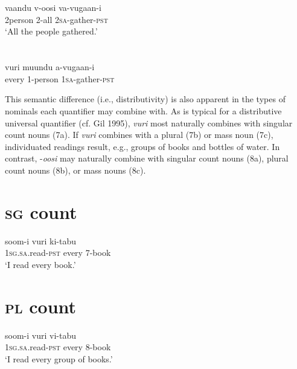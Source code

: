 \documentclass[output=paper]{langsci/langscibook}
\begin{document}
\chapter{}
\chapter{}
\gll vaandu  v-oosi    va-vugaan-i\\
     2person  2-all    2\textsc{sa}{}-gather-\textsc{pst  }\\
\glt ‘All the people gathered.’
\z

\chapter{}
\gll *vuri  muundu  a-vugaan-i  \\
\glt every  1-person  1\textsc{sa}{}-gather-\textsc{pst  }
\z

  This semantic difference (i.e., distributivity) is also apparent in the types of nominals each quantifier may combine with. As is typical for a distributive universal quantifier (cf. Gil 1995), \textit{vuri} most naturally combines with singular count nouns (7a). If \textit{vuri} combines with a plural (7b) or mass noun (7c), individuated readings result, e.g., groups of books and bottles of water. In contrast, -\textit{oosi} may naturally combine with singular count nouns (8a), plural count nouns (8b), or mass nouns (8c).

\chapter[  ]{\textit{  }}
\chapter[sg count]{\textsc{sg} count}
\gll soom-i      vuri    ki-tabu    \\
     1\textsc{sg.sa}.read-\textsc{pst}  every    7-book  \\
\glt ‘I read every book.’
\z

\chapter[pl count]{\textsc{pl} count}
\gll soom-i      vuri    vi-tabu    \\
     1\textsc{sg.sa}.read-\textsc{pst}  every    8-book\\
\glt ‘I read every group of books.’
\z
\end{document}
